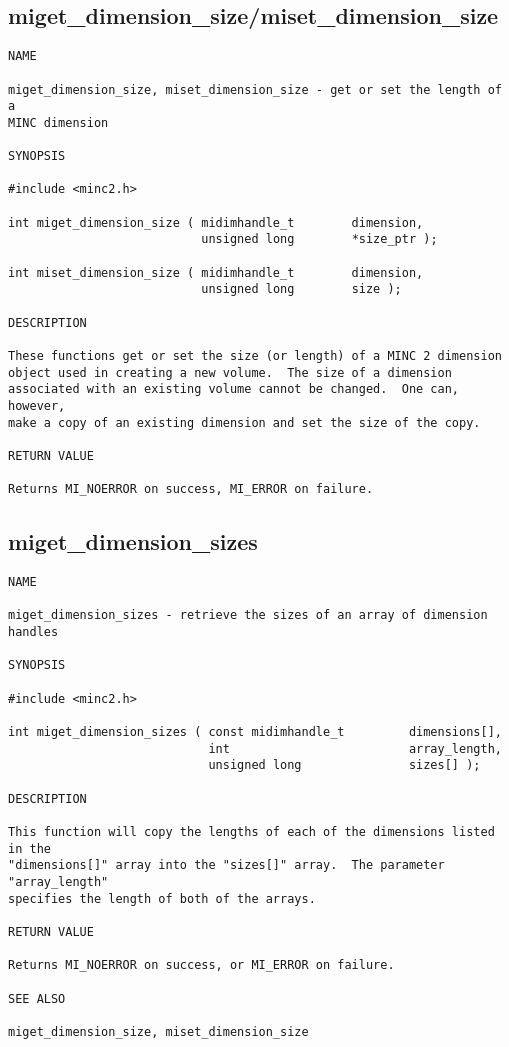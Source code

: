 \documentclass{article}
\begin{document}
\subsection{miget\_dimension\_size/miset\_dimension\_size}
\begin{verbatim}
NAME

miget_dimension_size, miset_dimension_size - get or set the length of a
MINC dimension

SYNOPSIS

#include <minc2.h>

int miget_dimension_size ( midimhandle_t        dimension, 
                           unsigned long        *size_ptr );

int miset_dimension_size ( midimhandle_t        dimension, 
                           unsigned long        size );

DESCRIPTION

These functions get or set the size (or length) of a MINC 2 dimension
object used in creating a new volume.  The size of a dimension
associated with an existing volume cannot be changed.  One can, however,
make a copy of an existing dimension and set the size of the copy. 

RETURN VALUE

Returns MI_NOERROR on success, MI_ERROR on failure.
\end{verbatim}

\subsection{miget\_dimension\_sizes}
\begin{verbatim}
NAME

miget_dimension_sizes - retrieve the sizes of an array of dimension handles

SYNOPSIS

#include <minc2.h>

int miget_dimension_sizes ( const midimhandle_t         dimensions[],
                            int                         array_length,
                            unsigned long               sizes[] );

DESCRIPTION

This function will copy the lengths of each of the dimensions listed in the
"dimensions[]" array into the "sizes[]" array.  The parameter "array_length"
specifies the length of both of the arrays.

RETURN VALUE

Returns MI_NOERROR on success, or MI_ERROR on failure.

SEE ALSO

miget_dimension_size, miset_dimension_size
\end{verbatim}
\end{document}
